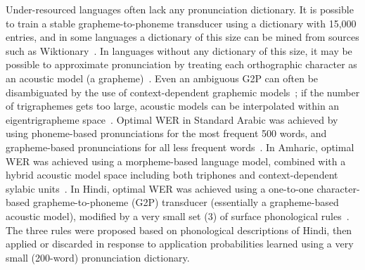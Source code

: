Under-resourced languages often lack any pronunciation dictionary.  It
is possible to train a stable grapheme-to-phoneme transducer using a
dictionary with 15,000 entries, and in some languages a dictionary of
this size can be mined from sources such as
Wiktionary~\cite{Schlippe2014}.  In languages without any dictionary
of this size, it may be possible to approximate pronunciation by
treating each orthographic character as an acoustic model (a
grapheme)~\cite{Kanthak2002,Charoenpornsawat06,Gizaw2008,Le2009}.
Even an ambiguous G2P can often be disambiguated by the use of
context-dependent graphemic models~\cite{Kanthak2002}; if the number
of trigraphemes gets too large, acoustic models can be interpolated
within an eigentrigrapheme space~\cite{Ko2014}.  Optimal WER in
Standard Arabic was achieved by using phoneme-based pronunciations for
the most frequent 500 words, and grapheme-based pronunciations for all
less frequent words~\cite{Elmahdy2012}.  In Amharic, optimal WER was
achieved using a morpheme-based language model, combined with a hybrid
acoustic model space including both triphones and context-dependent
sylabic units~\cite{Tachbelie2014}.  In Hindi, optimal WER was
achieved using a one-to-one character-based grapheme-to-phoneme (G2P)
transducer (essentially a grapheme-based acoustic model), modified by
a very small set (3) of surface phonological
rules~\cite{Jyothi2015interspeech_hindi}.  The three rules were
proposed based on phonological descriptions of Hindi, then applied or
discarded in response to application probabilities learned using a
very small (200-word) pronunciation dictionary.

